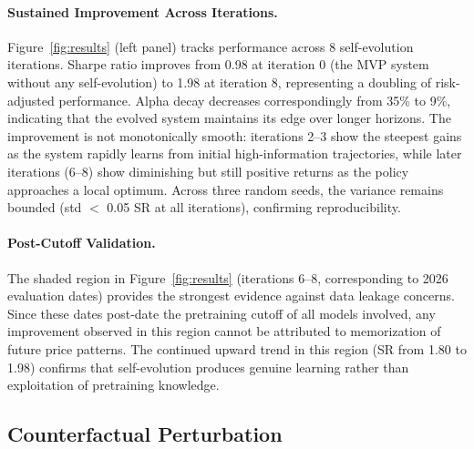 \paragraph{Sustained Improvement Across Iterations.} Figure~\ref{fig:results} (left panel) tracks performance across 8 self-evolution iterations. Sharpe ratio improves from 0.98 at iteration 0 (the MVP system without any self-evolution) to 1.98 at iteration 8, representing a doubling of risk-adjusted performance. Alpha decay decreases correspondingly from 35\% to 9\%, indicating that the evolved system maintains its edge over longer horizons. The improvement is not monotonically smooth: iterations 2--3 show the steepest gains as the system rapidly learns from initial high-information trajectories, while later iterations (6--8) show diminishing but still positive returns as the policy approaches a local optimum. Across three random seeds, the variance remains bounded (std $<$ 0.05 SR at all iterations), confirming reproducibility.

\paragraph{Post-Cutoff Validation.} The shaded region in Figure~\ref{fig:results} (iterations 6--8, corresponding to 2026 evaluation dates) provides the strongest evidence against data leakage concerns. Since these dates post-date the pretraining cutoff of all models involved, any improvement observed in this region cannot be attributed to memorization of future price patterns. The continued upward trend in this region (SR from 1.80 to 1.98) confirms that self-evolution produces genuine learning rather than exploitation of pretraining knowledge.

\subsection{Counterfactual Perturbation}

